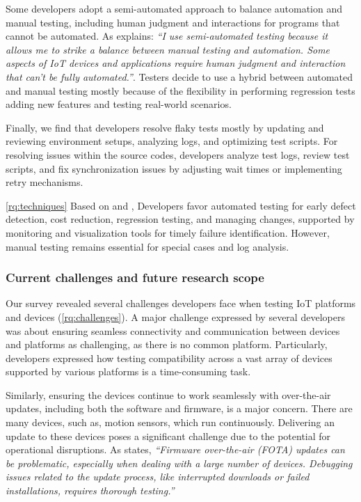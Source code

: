 Some developers adopt a semi-automated approach to balance automation and manual testing, including human judgment and interactions for programs that cannot be automated. As  explains: \textit{``I use semi-automated testing because it allows me to strike a balance between manual testing and automation. Some aspects of IoT devices and applications require human judgment and interaction that can't be fully automated.''}. Testers decide to use a hybrid between automated and manual testing mostly because of the flexibility in performing regression tests adding new features and testing real-world scenarios.


Finally, we find that developers resolve flaky tests mostly by updating and reviewing environment setups, analyzing logs, and optimizing test scripts. For resolving issues within the source codes, developers analyze test logs, review test scripts, and fix synchronization issues by adjusting wait times or implementing retry mechanisms.

\begin{boxK}
\ref{rq:techniques}
Based on  and , Developers favor automated testing for early defect detection, cost reduction, regression testing, and managing changes, supported by monitoring and visualization tools for timely failure identification. However, manual testing remains essential for special cases and log analysis.
\end{boxK}

\subsubsection{Current challenges and future research scope} 
Our survey revealed several challenges developers face when testing IoT platforms and devices (\ref{rq:challenges}).
A major challenge expressed by several developers was about ensuring seamless connectivity and communication between devices and platforms as challenging, as there is no common platform.
Particularly, developers expressed how testing compatibility across a vast array of devices supported by various platforms is a time-consuming task. 

\label{find:results5}

Similarly, ensuring the devices continue to work seamlessly with over-the-air updates, including both the software and firmware, is a major concern.  There are many \iot devices, such as, motion sensors, which run continuously. Delivering an update to these devices poses a significant challenge due to the potential for operational disruptions. As  states, \textit{``Firmware over-the-air (FOTA) updates can be problematic, especially when dealing with a large number of devices. Debugging issues related to the update process, like interrupted downloads or failed installations, requires thorough testing.''} 


